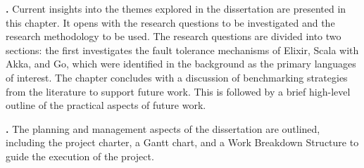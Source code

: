 \textbf{.} Current insights into the themes explored in the dissertation are presented in this chapter. It opens with the research questions to be investigated and the research methodology to be used. The research questions are divided into two sections: the first investigates the fault tolerance mechanisms of Elixir, Scala with Akka, and Go, which were identified in the background as the primary languages of interest. The chapter concludes with a discussion of benchmarking strategies from the literature to support future work. This is followed by a brief high-level outline of the practical aspects of future work. 

\textbf{.} The planning and management aspects of the dissertation are outlined, including the project charter, a Gantt chart, and a Work Breakdown Structure to guide the execution of the project.